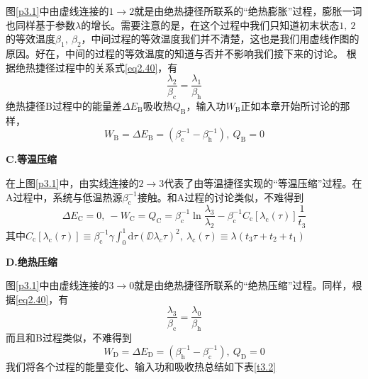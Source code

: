 图\ref{p3.1}中由虚线连接的$1 \to 2$就是由绝热捷径所联系的“绝热膨胀”过程，膨胀一词也同样基于参数$\lambda$的增长。需要注意的是，在这个过程中我们只知道初末状态$1,\ 2$的等效温度$\beta_1 ,\ \beta_2$，中间过程的等效温度我们并不清楚，这也是我们用虚线作图的原因。好在，中间的过程的等效温度的知道与否并不影响我们接下来的讨论。
根据绝热捷径过程中的关系式\eqref{eq2.40}，有
\begin{equation}
    \frac{\lambda_2}{\beta_{\mathrm{c}}} =\frac{\lambda_1}{\beta_{\mathrm{h}}}
    \label{eq3.16.5}
\end{equation}
绝热捷径B过程中的能量差$\Delta E_{\mathrm{B}}$吸收热$Q_{\mathrm{B}}$，输入功$W_{\mathrm{B}}$正如本章开始所讨论的那样，
\begin{equation}
    W_{\mathrm{B}} = \Delta E_{\mathrm{B}} = (\beta_{\mathrm{c}}^{-1} - \beta_{\mathrm{h}}^{-1}),\  Q_{\mathrm{B}}=0
    \label{eq3.17}
\end{equation}

\begin{center}
    {\bfseries C.等温压缩}
\end{center}

在上图\ref{p3.1}中，由实线连接的$2 \to 3$代表了由等温捷径实现的“等温压缩”过程。在A过程中，系统与低温热源$\beta_\mathrm{c}^{-1}$接触。和A过程的讨论类似，不难得到
\begin{equation}
    \Delta E_{\mathrm{C}}=0,\ -W_{\mathrm{C}}=Q_{\mathrm{C}} = \beta_{\mathrm{c}}^{-1} \ln{\frac{\lambda_3}{\lambda_2}} - \beta_{\mathrm{c}}^{-1} C_{\mathrm{c}} [\lambda_{\mathrm{c}}(\tau)] \frac{1}{t_3}
    \label{eq3.18}
\end{equation}
其中$C_{\mathrm{c}} [\lambda_{\mathrm{c}}(\tau)]\equiv \beta_{\mathrm{c}}^{-1} \gamma \int_{0}^{1} \mathrm{d} \tau    \left(\DD{\lambda_{c}}{\tau}\right)^2,\ \lambda_{\mathrm{c}}(\tau)\equiv\lambda(t_3 \tau + t_2 +t_1)$
\begin{center}
    {\bfseries D.绝热压缩}
\end{center}

图\ref{p3.1}中由虚线连接的$3 \to 0$就是由绝热捷径所联系的“绝热压缩”过程。同样，根据\eqref{eq2.40}，有
\begin{equation}
    \frac{\lambda_3}{\beta_{\mathrm{c}}} =\frac{\lambda_0}{\beta_{\mathrm{h}}}
    \label{eq3.18.5}
\end{equation}
而且和B过程类似，不难得到
\begin{equation}
    W_{\mathrm{D}} = \Delta E_{\mathrm{D}} = (\beta_{\mathrm{h}}^{-1} - \beta_{\mathrm{c}}^{-1}),\  Q_{\mathrm{D}}=0
    \label{eq3.19}
\end{equation}
我们将各个过程的能量变化、输入功和吸收热总结如下表\ref{t3.2}

